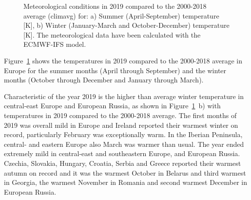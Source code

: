\begin{figure}[h]
  \caption{Meteorological conditions in 2019 compared to the 2000-2018 average (climavg) for: a) Summer (April-September) temperature [K], b) Winter (January-March and October-December) temperature [K]. The meteorological data have been calculated with the ECMWF-IFS model.} 
\label{fig:temp-avMET}
\end{figure}

Figure~\ref{fig:temp-avMET} shows the temperatures in 2019 compared to the 2000-2018 average in Europe for the summer months (April through September) and the winter months (October through December and January through March). 

Characteristic of the year 2019 is the higher than average winter temperature in central-east Europe and European Russia, as shown in Figure~\ref{fig:temp-avMET}~b) with temperatures in 2019 compared to the 2000-2018 average. The first months of 2019 was overall mild in Europe and Ireland reported their warmest winter on record, particularly February was exceptionally warm. In the Iberian Peninsula, central- and eastern Europe also March was warmer than usual. The year ended extremely mild in central-east and southeastern Europe, and European Russia. Czechia, Slovakia, Hungary, Croatia, Serbia and Greece reported their warmest autumn on record and it was the warmest October in Belarus and third warmest in Georgia, the warmest November in Romania and second warmest December in European Russia.

